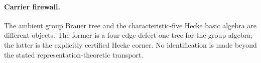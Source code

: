 \paragraph{Carrier firewall.} The ambient group Brauer tree and the characteristic-five Hecke basic algebra are different objects. The former is a four-edge defect-one tree for the group algebra; the latter is the explicitly certified Hecke corner. No identification is made beyond the stated representation-theoretic transport.
